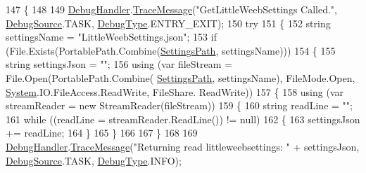 \begin{DoxyCode}
147         \{
148 
149             \mbox{\hyperlink{class_little_weeb_library_1_1_handlers_1_1_settings_handler_a80da61f3a3fcbb5f9ac6057591a98acf}{DebugHandler}}.\mbox{\hyperlink{interface_little_weeb_library_1_1_handlers_1_1_i_debug_handler_a2e405bc3492e683cd3702fae125221bc}{TraceMessage}}(\textcolor{stringliteral}{"GetLittleWeebSettings Called."}, 
      \mbox{\hyperlink{namespace_little_weeb_library_1_1_handlers_a2a6ca0775121c9c503d58aa254d292be}{DebugSource}}.TASK, \mbox{\hyperlink{namespace_little_weeb_library_1_1_handlers_ab66019ed40462876ec4e61bb3ccb0a62}{DebugType}}.ENTRY\_EXIT);
150             \textcolor{keywordflow}{try}
151             \{
152                 \textcolor{keywordtype}{string} settingsName = \textcolor{stringliteral}{"LittleWeebSettings.json"};
153                 \textcolor{keywordflow}{if} (File.Exists(PortablePath.Combine(\mbox{\hyperlink{class_little_weeb_library_1_1_handlers_1_1_settings_handler_a2e309fc6b949f0bb7e7ace8c2017be7f}{SettingsPath}}, settingsName)))
154                 \{
155                     \textcolor{keywordtype}{string} settingsJson = \textcolor{stringliteral}{""};
156                     \textcolor{keyword}{using} (var fileStream = File.Open(PortablePath.Combine(
      \mbox{\hyperlink{class_little_weeb_library_1_1_handlers_1_1_settings_handler_a2e309fc6b949f0bb7e7ace8c2017be7f}{SettingsPath}}, settingsName), FileMode.Open, \mbox{\hyperlink{namespace_system}{System}}.IO.FileAccess.ReadWrite, FileShare.
      ReadWrite))
157                     \{
158                         \textcolor{keyword}{using} (var streamReader = \textcolor{keyword}{new} StreamReader(fileStream))
159                         \{
160                             \textcolor{keywordtype}{string} readLine = \textcolor{stringliteral}{""};
161                             \textcolor{keywordflow}{while} ((readLine = streamReader.ReadLine()) != null)
162                             \{
163                                 settingsJson += readLine;
164                             \}
165                         \}
166 
167                     \}
168 
169                     \mbox{\hyperlink{class_little_weeb_library_1_1_handlers_1_1_settings_handler_a80da61f3a3fcbb5f9ac6057591a98acf}{DebugHandler}}.\mbox{\hyperlink{interface_little_weeb_library_1_1_handlers_1_1_i_debug_handler_a2e405bc3492e683cd3702fae125221bc}{TraceMessage}}(\textcolor{stringliteral}{"Returning read littleweebsettings: "}
       + settingsJson, \mbox{\hyperlink{namespace_little_weeb_library_1_1_handlers_a2a6ca0775121c9c503d58aa254d292be}{DebugSource}}.TASK, \mbox{\hyperlink{namespace_little_weeb_library_1_1_handlers_ab66019ed40462876ec4e61bb3ccb0a62}{DebugType}}.INFO);

\end{DoxyCode}
